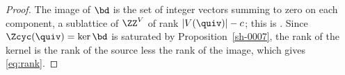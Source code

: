 \begin{proof}
The image of $\bd$ is the set of integer vectors summing to zero on each component, a sublattice of $\ZZ^{V}$ of rank $|V(\quiv)| - c$; this is \cite[Proposition 2.1]{Arden24}. Since $\Zcyc(\quiv) = \ker \bd$ is saturated by Proposition~\ref{sh-0007}, the rank of the kernel is the rank of the source less the rank of the image, which gives \eqref{eq:rank}.
\end{proof}